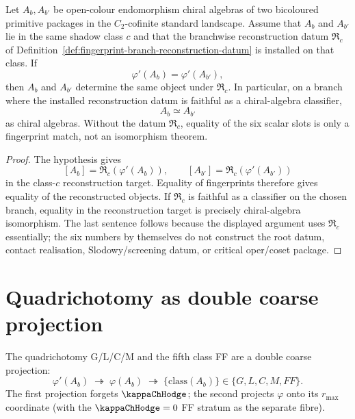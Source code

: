 \begin{theorem}
\label{thm:fingerprint-complete-ch}
Let $A_b, A_{b'}$ be open-colour endomorphism chiral algebras of two
bicoloured primitive packages in the $C_2$-cofinite standard landscape.
Assume that \(A_b\) and \(A_{b'}\) lie in the same shadow class
\(c\) and that the branchwise reconstruction datum
\(\mathfrak R_c\) of
Definition~\ref{def:fingerprint-branch-reconstruction-datum} is
installed on that class.  If
\[
\varphi'(A_b)=\varphi'(A_{b'}),
\]
then \(A_b\) and \(A_{b'}\) determine the same object under
\(\mathfrak R_c\).  In particular, on a branch where the installed
reconstruction datum is faithful as a chiral-algebra classifier,
\[
A_b\simeq A_{b'}
\]
as chiral algebras.  Without the datum \(\mathfrak R_c\), equality of
the six scalar slots is only a fingerprint match, not an isomorphism
theorem.
\end{theorem}

\begin{proof}
The hypothesis gives
\[
[A_b]=\mathfrak R_c(\varphi'(A_b)),\qquad
[A_{b'}]=\mathfrak R_c(\varphi'(A_{b'}))
\]
in the class-\(c\) reconstruction target.  Equality of fingerprints
therefore gives equality of the reconstructed objects.  If
\(\mathfrak R_c\) is faithful as a classifier on the chosen branch,
equality in the reconstruction target is precisely chiral-algebra
isomorphism.  The last sentence follows because the displayed argument
uses \(\mathfrak R_c\) essentially; the six numbers by themselves do
not construct the root datum, contact realisation, Slodowy/screening
datum, or critical oper/coset package.
\end{proof}

\section{Quadrichotomy as double coarse projection}
\label{sec:quadrichotomy-projection}

\begin{corollary}
\label{cor:double-coarse-projection}
The quadrichotomy G/L/C/M and the fifth class FF are a double coarse
projection:
\[
 \varphi'(A_b)
 \;\twoheadrightarrow\;
 \varphi(A_b)
 \;\twoheadrightarrow\;
 \{\text{class}(A_b)\} \in \{G, L, C, M, FF\}.
\]
The first projection forgets $\kappaChHodge$; the second projects
$\varphi$ onto its $r_{\max}$ coordinate (with the $\kappaChHodge = 0$
FF stratum as the separate fibre).
\end{corollary}

